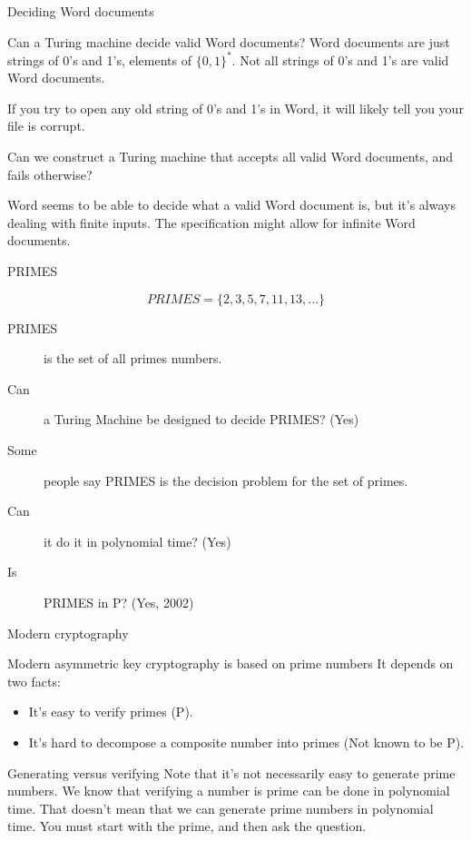 \begin{frame}{Deciding Word documents}
  \begin{alertblock}{Can a Turing machine decide valid Word documents?}
    Word documents are just strings of 0's and 1's, elements of $\{0,1\}^*$.
    Not all strings of 0's and 1's are valid Word documents.
    
    If you try to open any old string of 0's and 1's in Word, it will likely tell you your file is corrupt.
    
    Can we construct a Turing machine that accepts all valid Word documents, and fails otherwise?
    
    Word seems to be able to decide what a valid Word document is, but it's always dealing with finite inputs.
    The specification might allow for infinite Word documents.
  \end{alertblock}
\end{frame}

\begin{frame}{PRIMES}
  \begin{definition}
    $$ PRIMES = \{ 2, 3, 5, 7, 11, 13, ... \} $$
  \end{definition}
  \begin{description}
    \item[PRIMES] is the set of all primes numbers.
    \item[Can] a Turing Machine be designed to decide PRIMES? (Yes)
    \item[Some] people say PRIMES is the decision problem for the set of primes.
    \item[Can] it do it in polynomial time? (Yes)
    \item[Is] PRIMES in P? (Yes, 2002)
  \end{description}
\end{frame}

\begin{frame}{Modern cryptography}
  \begin{alertblock}{Modern asymmetric key cryptography is based on prime numbers}
    It depends on two facts:
    \begin{itemize}
      \item It's easy to verify primes (P).
      \item It's hard to decompose a composite number into primes (Not known to be P).
    \end{itemize}
  \end{alertblock}
  \begin{alertblock}{Generating versus verifying}
    Note that it's not necessarily easy to generate prime numbers.
    We know that verifying a number is prime can be done in polynomial time.
    That doesn't mean that we can generate prime numbers in polynomial time.
    You must start with the prime, and then ask the question.
  \end{alertblock}

\end{frame}

